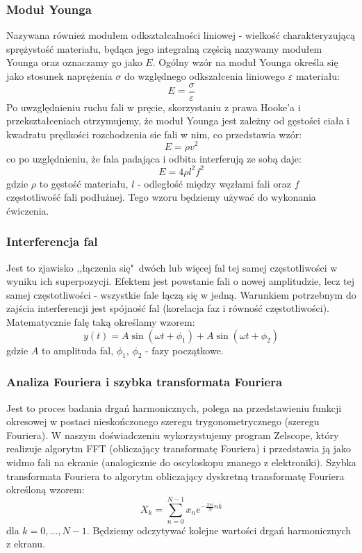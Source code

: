 \documentclass[a4paper,12pts]{article}
\begin{document}
\subsubsection{Moduł Younga}
Nazywana również modułem odkształcalności liniowej - wielkość charakteryzującą sprężystość materiału, będąca jego integralną częścią nazywamy modułem Younga oraz oznaczamy go jako $E$. Ogólny wzór na moduł Younga określa się jako stosunek naprężenia $\sigma$ do względnego odkszałcenia liniowego $\varepsilon$ materiału:
\begin{equation}
E = \frac{\sigma}{\varepsilon}
\end{equation}
Po uwzględnieniu ruchu fali w pręcie, skorzystaniu z prawa Hooke'a i przekształceniach otrzymujemy, że moduł Younga jest zależny od gęstości ciała i kwadratu prędkości rozchodzenia sie fali w nim, co przedstawia wzór:
\begin{equation}
	E = \rho v^2
\end{equation}
co po uzględnieniu, że fala padająca i odbita interferują ze sobą daje:
\begin{equation}
E = 4 \rho l^2 f^2
\end{equation}
gdzie $\rho$ to gęstość materiału, $l$ - odległość między węzłami fali oraz $f$ częstotliwość fali podłużnej. Tego wzoru będziemy używać do wykonania ćwiczenia.

\subsubsection{Interferencja fal}
Jest to zjawisko ,,łączenia się"~dwóch lub więcej fal tej samej częstotliwości w wyniku ich superpozycji. Efektem jest powstanie fali o nowej amplitudzie, lecz tej samej częstotliwości - wszystkie fale łączą się w jedną. Warunkiem potrzebnym do zajścia interferencji jest spójność fal (korelacja faz i równość częstotliwości). Matematycznie falę taką określamy wzorem:
\begin{equation}
	y(t) = A\sin (\omega t + \phi_1) + A \sin (\omega t + \phi_2)
\end{equation}
gdzie $A$ to amplituda fal, $\phi_1$, $\phi_2$ - fazy początkowe.

\subsubsection{Analiza Fouriera i szybka transformata Fouriera}
Jest to proces badania drgań harmonicznych, polega na przedstawieniu funkcji okresowej w postaci nieskończonego szeregu trygonometrycznego (szeregu Fouriera). W naszym doświadczeniu wykorzystujemy program Zelscope, który realizuje algorytm FFT (obliczający transformatę Fouriera) i przedstawia ją jako widmo fali na ekranie (analogicznie do oscyloskopu znanego z elektroniki). Szybka transformata Fouriera to algorytm obliczający dyskretną transformatę Fouriera określoną wzorem:
\begin{equation}
	X_k = \sum_{n=0}^{N-1} x_ne^{-\frac{2 \pi i}{N}nk}
\end{equation} 
dla $k = 0, ..., N-1$. Będziemy odczytywać kolejne wartości drgań harmonicznych z ekranu.
\end{document}
